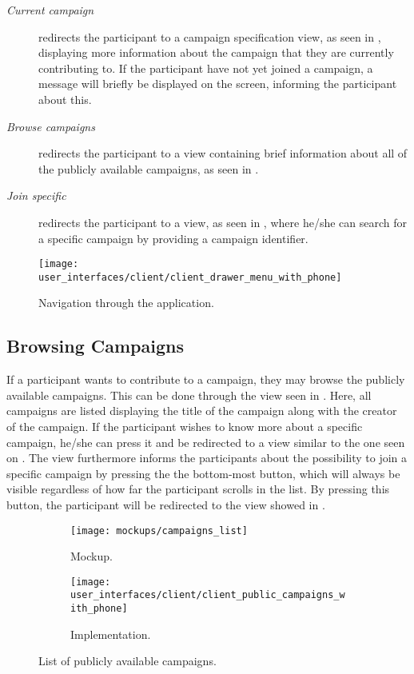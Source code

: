 \begin{description}
	\item[\emph{Current campaign}] redirects the participant to a campaign specification view, as seen in , displaying more information about the campaign that they are currently contributing to. If the participant have not yet joined a campaign, a message will briefly be displayed on the screen, informing the participant about this.

	\item[\emph{Browse campaigns}] redirects the participant to a view containing brief information about all of the publicly available campaigns, as seen in .

	\item[\emph{Join specific}] redirects the participant to a view, as seen in , where he/she can search for a specific campaign by providing a campaign identifier.
\end{description}

\begin{figure}[!htbp]
\centering
\texttt{[image: user\_interfaces/client/client\_drawer\_menu\_with\_phone]}
\caption{Navigation through the application.}
\label{fig:navigation}
\end{figure}
\FloatBarrier

\subsection{Browsing Campaigns}
If a participant wants to contribute to a campaign, they may browse the publicly available campaigns. This can be done through the view seen in . Here, all campaigns are listed displaying the title of the campaign along with the creator of the campaign. If the participant wishes to know more about a specific campaign, he/she can press it and be redirected to a view similar to the one seen on . The view furthermore informs the participants about the possibility to join a specific campaign by pressing the the bottom-most button, which will always be visible regardless of how far the participant scrolls in the list. By pressing this button, the participant will be redirected to the view showed in .

\begin{figure}[!htbp]
\begin{subfigure}[!t]{.48\textwidth}
  \centering
  \texttt{[image: mockups/campaigns\_list]}
  \caption{Mockup.}
  \label{fig:mockup_public_campaigns}
\end{subfigure}%
\begin{subfigure}[!t]{.52\textwidth}
  \centering
  \texttt{[image: user\_interfaces/client/client\_public\_campaigns\_with\_phone]}
  \caption{Implementation.}
  \label{fig:implementation_public_campaigns}
\end{subfigure}
\caption{List of publicly available campaigns.}
\label{fig:public_campaigns}
\end{figure}
\FloatBarrier

